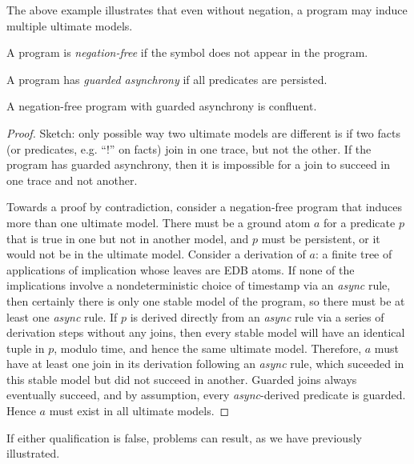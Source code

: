 The above example illustrates that even without negation, a \lang program may induce multiple ultimate models.

\begin{definition}
A \lang program is {\em negation-free} if the \dedalus{!} symbol does not appear in the program.
\end{definition}

\begin{definition}
A \lang program has {\em guarded asynchrony} if all  predicates are persisted.
\end{definition}

\begin{lemma}
\label{lem:guarding}
A negation-free \lang program with guarded asynchrony is confluent.
\end{lemma}
\begin{proof}
Sketch: only possible way two ultimate models are different is if two facts (or predicates, e.g. ``!'' on facts) join in one trace, but not the other.  If the program has guarded asynchrony, then it is impossible for a join to succeed in one trace and not another.


Towards a proof by contradiction, consider a negation-free \lang program that 
induces more than one ultimate model.  There must be a ground atom $a$ for a predicate $p$
that is true in one but
not in another model, and $p$ must be persistent, or it would not be
in the ultimate model.  Consider a derivation of $a$: a finite tree of applications of
implication whose leaves are EDB atoms.  If none of the implications involve a nondeterministic
choice of timestamp via an {\em async} rule, then certainly there is only one stable model of the
program, so there must be at least one {\em async} rule.  If $p$ is derived directly from 
an {\em async} rule via a series of derivation steps without any joins, then every stable
model will have an identical tuple in $p$, modulo time, and hence the same ultimate model.
Therefore, $a$ must have at least one join in its derivation following an {\em async} rule,
which suceeded in this stable model but did not succeed in another.  Guarded joins always
eventually succeed, and by assumption, every {\em async}-derived predicate is guarded.
Hence $a$ must exist in all ultimate models.

\end{proof}


If either qualification is false, problems can result, as we have previously illustrated.


